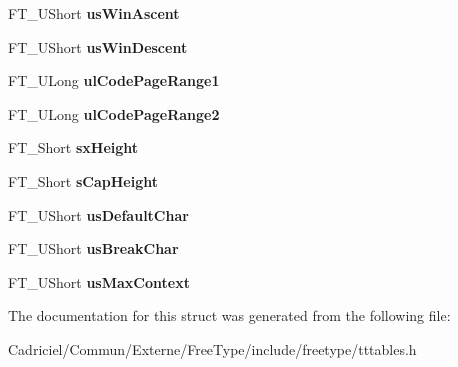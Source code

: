 \begin{DoxyCompactItemize}
\item 
F\+T\+\_\+\+U\+Short {\bfseries us\+Win\+Ascent}\hypertarget{struct_t_t___o_s2___aeb85b76e77753e4b59945550bdd098a1}{}\label{struct_t_t___o_s2___aeb85b76e77753e4b59945550bdd098a1}

\item 
F\+T\+\_\+\+U\+Short {\bfseries us\+Win\+Descent}\hypertarget{struct_t_t___o_s2___a573ace3da03efa98a716a8443e4d0084}{}\label{struct_t_t___o_s2___a573ace3da03efa98a716a8443e4d0084}

\item 
F\+T\+\_\+\+U\+Long {\bfseries ul\+Code\+Page\+Range1}\hypertarget{struct_t_t___o_s2___a0b5a2875c21d20e5a5b5f3641ddb29fc}{}\label{struct_t_t___o_s2___a0b5a2875c21d20e5a5b5f3641ddb29fc}

\item 
F\+T\+\_\+\+U\+Long {\bfseries ul\+Code\+Page\+Range2}\hypertarget{struct_t_t___o_s2___ad117c64d73d15d1304c75fb5f41f1124}{}\label{struct_t_t___o_s2___ad117c64d73d15d1304c75fb5f41f1124}

\item 
F\+T\+\_\+\+Short {\bfseries sx\+Height}\hypertarget{struct_t_t___o_s2___a2eb3bb1392461a536c393304bde72835}{}\label{struct_t_t___o_s2___a2eb3bb1392461a536c393304bde72835}

\item 
F\+T\+\_\+\+Short {\bfseries s\+Cap\+Height}\hypertarget{struct_t_t___o_s2___ac755913b648d535d1207927e4a6f1ec0}{}\label{struct_t_t___o_s2___ac755913b648d535d1207927e4a6f1ec0}

\item 
F\+T\+\_\+\+U\+Short {\bfseries us\+Default\+Char}\hypertarget{struct_t_t___o_s2___af8639fefeb705a9287df996b224462ea}{}\label{struct_t_t___o_s2___af8639fefeb705a9287df996b224462ea}

\item 
F\+T\+\_\+\+U\+Short {\bfseries us\+Break\+Char}\hypertarget{struct_t_t___o_s2___a1d47030e246d2593ec3e4cdf66b17161}{}\label{struct_t_t___o_s2___a1d47030e246d2593ec3e4cdf66b17161}

\item 
F\+T\+\_\+\+U\+Short {\bfseries us\+Max\+Context}\hypertarget{struct_t_t___o_s2___a167313e407c77db2c4ca5a987f3a1482}{}\label{struct_t_t___o_s2___a167313e407c77db2c4ca5a987f3a1482}

\end{DoxyCompactItemize}


The documentation for this struct was generated from the following file\+:\begin{DoxyCompactItemize}
\item 
Cadriciel/\+Commun/\+Externe/\+Free\+Type/include/freetype/tttables.\+h\end{DoxyCompactItemize}
